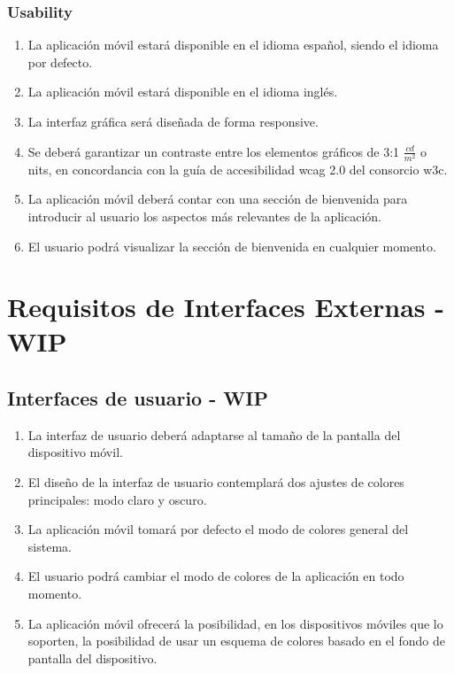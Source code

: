         \subsubsection{Usability}
            \begin{enumerate}[resume, label=\textbf{\texttt{RNF-\arabic*}}]
                \item La aplicación móvil estará disponible en el idioma español, siendo el idioma por defecto.
                \item La aplicación móvil estará disponible en el idioma inglés.
                \item La interfaz gráfica será diseñada de forma \gls{responsive}.
                \item Se deberá garantizar un contraste entre los elementos gráficos de 3:1 $\frac{cd}{m^{2}}$ o nits, en concordancia con la guía de accesibilidad \gls{wcag} 2.0 del consorcio \gls{w3c}\cite{w3c_web_2008}.
                \item La aplicación móvil deberá contar con una sección de bienvenida para introducir al usuario los aspectos más relevantes de la aplicación.
                \item El usuario podrá visualizar la sección de bienvenida en cualquier momento.
            \end{enumerate}

\section{Requisitos de Interfaces Externas - WIP}
    \label{req:interfaces}

    \subsection{Interfaces de usuario - WIP}
    \label{req:interfaces:usuario}
        \begin{enumerate}[label=\textbf{\texttt{RIU-\arabic*}}]
            \item La interfaz de usuario deberá adaptarse al tamaño de la pantalla del dispositivo móvil.
            \item El diseño de la interfaz de usuario contemplará dos ajustes de colores principales: modo claro y oscuro.
            \item La aplicación móvil tomará por defecto el modo de colores general del sistema.
            \item El usuario podrá cambiar el modo de colores de la aplicación en todo momento. 
            \item La aplicación móvil ofrecerá la posibilidad, en los dispositivos móviles que lo soporten, la posibilidad de usar un esquema de colores basado en el fondo de pantalla del dispositivo.
        \end{enumerate}

